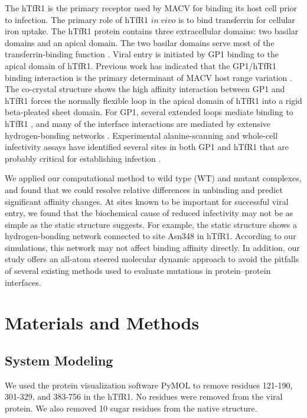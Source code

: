 \documentclass[journal=jacsat,manuscript=article]{achemso}
\begin{document}
The hTfR1 is the primary receptor used by MACV for binding its host cell prior to infection. The primary role of hTfR1 $in~vivo$ is to bind transferrin for cellular iron uptake. The hTfR1 protein contains three extracellular domains: two basilar domains and an apical domain. The two basilar domains serve most of the transferrin-binding function \cite{Abraham2010,Rad20112}. Viral entry is initiated by GP1 binding to the apical domain of hTfR1. Previous work has indicated that the GP1/hTfR1 binding interaction is the primary determinant of MACV host range variation \cite{Rad20111,Rad20112}. The co-crystal structure shows the high affinity interaction between GP1 and hTfR1 forces the normally flexible loop in the apical domain of hTfR1 into a rigid beta-pleated sheet domain. For GP1, several extended loops mediate binding to hTfR1 \cite{Abraham2010,Rad20112}, and many of the interface interactions are mediated by extensive hydrogen-bonding networks \cite{Abraham2010}. Experimental alanine-scanning and whole-cell infectivity assays have identified several sites in both GP1 and hTfR1 that are probably critical for establishing infection \cite{Rad20111,Rad20112}.

We applied our computational method to wild type (WT) and mutant complexes, and found that we could resolve relative differences in unbinding and predict significant affinity changes. At sites known to be important for successful viral entry, we found that the biochemical cause of reduced infectivity may not be as simple as the static structure suggests. For example, the static structure shows a hydrogen-bonding network connected to site Asn348 in hTfR1. According to our simulations, this network may not affect binding affinity directly. In addition, our study offers an all-atom steered molecular dynamic approach to avoid the pitfalls of several existing methods used to evaluate mutations in protein--protein interfaces.

\section{Materials and Methods}

\subsection{System Modeling}

We used the protein visualization software PyMOL \cite{PyMOL} to remove residues 121-190, 301-329, and 383-756 in the hTfR1. No residues were removed from the viral protein. We also removed 10 sugar residues from the native structure.
\end{document}
